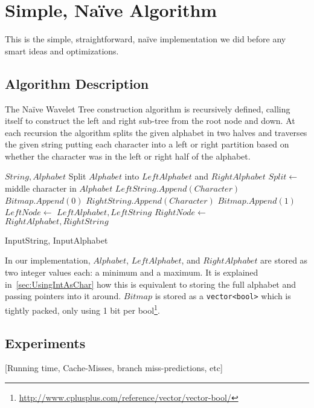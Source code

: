 \section{Simple, Naïve Algorithm}
This is the simple, straightforward, naïve implementation we did before any smart ideas and optimizations.
\subsection{Algorithm Description}
The Naïve Wavelet Tree construction algorithm is recursively defined, calling itself to construct the left and right sub-tree from the root node and down. At each recursion the algorithm splits the given alphabet in two halves and traverses the given string putting each character into a left or right partition based on whether the character was in the left or right half of the alphabet.

\begin{mdframed}[nobreak]
\begin{algorithmic}
 {$String, Alphabet$}
	\State \Return
\EndIf
\State Split $Alphabet$ into $LeftAlphabet$ and $RightAlphabet$
\State $Split \gets$ middle character in $Alphabet$
		\State $LeftString.Append(Character)$
		\State $Bitmap.Append(0)$
	\Else
		\State $RightString.Append(Character)$
		\State $Bitmap.Append(1)$
	\EndIf
\EndFor
\State $LeftNode \gets$  {$LeftAlphabet, LeftString$}
\State $RightNode \gets$  {$RightAlphabet, RightString$}
\EndFunction

\State {} {InputString, InputAlphabet}
\end{algorithmic}
\end{mdframed}

\noindent In our implementation, $Alphabet$, $LeftAlphabet$, and $RightAlphabet$ are stored as two integer values each: a minimum and a maximum. It is explained in~\ref{sec:UsingIntAsChar} how this is equivalent to storing the full alphabet and passing pointers into it around. $Bitmap$ is stored as a \texttt{vector<bool>} which is tightly packed, only using 1 bit per bool\footnote{\url{http://www.cplusplus.com/reference/vector/vector-bool/}}.



\subsection{Experiments}
[Running time, Cache-Misses, branch miss-predictions, etc]

